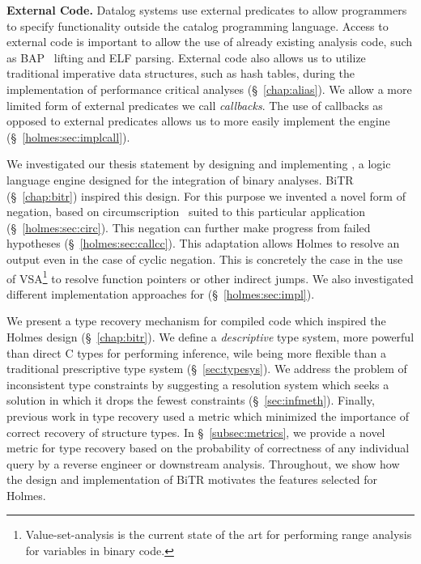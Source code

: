 \noindent\textbf{External Code.}
Datalog systems use external predicates to allow programmers to specify functionality outside the catalog programming language.
Access to external code is important to allow the use of already existing analysis code, such as BAP~\cite{bap} lifting and ELF parsing.
External code also allows us to utilize traditional imperative data structures, such as hash tables, during the implementation of performance critical analyses (\S~\ref{chap:alias}).
We allow a more limited form of external predicates we call \emph{callbacks}.
The use of callbacks as opposed to external predicates allows us to more easily implement the engine (\S~\ref{holmes:sec:implcall}).

We investigated our thesis statement by designing and implementing \sysname, a logic language engine designed for the integration of binary analyses.
{\sc BiTR} (\S~\ref{chap:bitr}) inspired this design.
For this purpose we invented a novel form of negation, based on circumscription~\cite{circumscription} suited to this particular application (\S~\ref{holmes:sec:circ}).
This negation can further make progress from failed hypotheses (\S~\ref{holmes:sec:callcc}).
This adaptation allows Holmes to resolve an output even in the case of cyclic negation.
This is concretely the case in the use of VSA\cite{vsa}\footnote{
	Value-set-analysis is the current state of the art for performing range analysis for variables in binary code.
}
to resolve function pointers or other indirect jumps.
We also investigated different implementation approaches for \sysname (\S~\ref{holmes:sec:impl}).

We present a type recovery mechanism for compiled code which inspired the Holmes design (\S~\ref{chap:bitr}).
We define a \emph{descriptive} type system, more powerful than direct C types for performing inference, wile being more flexible than a traditional prescriptive type system (\S~\ref{sec:typesys}).
We address the problem of inconsistent type constraints by suggesting a resolution system which seeks a solution in which it drops the fewest constraints (\S~\ref{sec:infmeth}).
Finally, previous work in type recovery used a metric which minimized the importance of correct recovery of structure types.
In \S~\ref{subsec:metrics}, we provide a novel metric for type recovery based on the probability of correctness of any individual query by a reverse engineer or downstream analysis.
Throughout, we show how the design and implementation of {\sc BiTR} motivates the features selected for Holmes.

